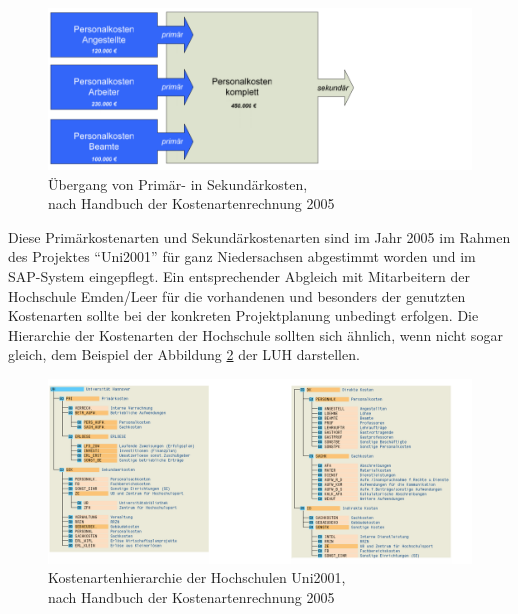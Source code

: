 \begin{figure}[h!]
	\centering
	\includegraphics[width=\textwidth]
	{kapitel/gruppe4_2/bilder/uebergang_primaerkosten}
	\caption{Übergang von Primär- in Sekundärkosten,\\nach Handbuch der Kostenartenrechnung 2005}
	\label{fig_uebergang_primaerkosten}
\end{figure}

Diese Primärkostenarten und Sekundärkostenarten sind im Jahr 2005 im Rahmen des Projektes “Uni2001” für ganz Niedersachsen abgestimmt worden und im SAP-System eingepflegt. Ein entsprechender Abgleich mit Mitarbeitern der Hochschule Emden/Leer für die vorhandenen und besonders der genutzten Kostenarten sollte bei der konkreten Projektplanung unbedingt erfolgen. Die Hierarchie der Kostenarten der Hochschule sollten sich ähnlich, wenn nicht sogar gleich, dem Beispiel der Abbildung \ref{fig_kostenartenhierarchie_uni2001} der LUH darstellen.

\begin{figure}[h!]
	\centering
	\includegraphics[width=\textwidth]
	{kapitel/gruppe4_2/bilder/kostenartenhierarchie_uni2001}
	\caption{Kostenartenhierarchie der Hochschulen Uni2001,\\nach Handbuch der Kostenartenrechnung 2005}
	\label{fig_kostenartenhierarchie_uni2001}
\end{figure}